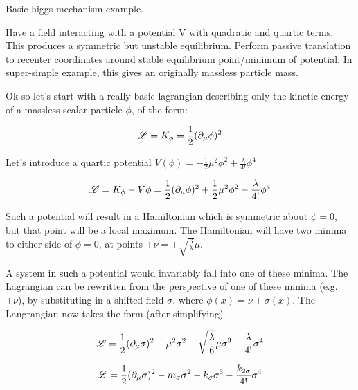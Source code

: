         Basic higgs mechanism example.

        Have a field interacting with a potential V with quadratic and quartic terms.
        This produces a symmetric but unstable equilibrium.
        Perform passive translation to recenter coordinates around stable equilibrium point/minimum of potential.
        In super-simple example, this gives an originally massless particle mass.

        Ok so let's start with a really basic lagrangian describing only the kinetic energy of a massless scalar particle $\phi$, of the form:

        \begin{equation}
            \mathscr{L} = K_{\phi} = \frac{1}{2} (\partial_{\mu} \phi)^2
        \end{equation}

        Let's introduce a quartic potential $V(\phi) = -\frac{1}{2} \mu^2 \phi^2 + \frac{\lambda}{4!} \phi^4$

        \begin{equation}
            \mathscr{L} = K_{\phi} - V{\phi} = \frac{1}{2} (\partial_{\mu} \phi)^2 
                +\frac{1}{2} \mu^2 \phi^2 - \frac{\lambda}{4!} \phi^4
        \end{equation}

        Such a potential will result in a Hamiltonian which is symmetric about $\phi=0$, but that point will be a local maximum.%
        The Hamiltonian will have two minima to either side of $\phi=0$, at points $\pm \nu = \pm \sqrt{\frac{6}{\lambda}} \mu$.

        A system in such a potential would invariably fall into one of these minima.
        The Lagrangian can be rewritten from the perspective of one of these minima (e.g.\ $+\nu$),
            by substituting in a shifted field $\sigma$, where $\phi(x)=\nu+\sigma(x)$.
        The Langrangian now takes the form (after simplifying)

        \begin{equation}
            \mathscr{L} = \frac{1}{2} (\partial_{\mu} \sigma)^2
                - \mu^2 \sigma^2
                -\sqrt{\frac{\lambda}{6}} \mu \sigma^3
                - \frac{\lambda}{4!} \sigma^4 \\
        \end{equation}

        \begin{equation}
            \mathscr{L} = \frac{1}{2} (\partial_{\mu} \sigma)^2
                - m_{\sigma} \sigma^2
                - k_{\sigma} \sigma^3
                - \frac{k_{2\sigma}}{4!} \sigma^4
        \end{equation}

